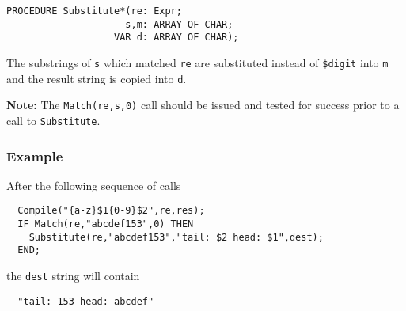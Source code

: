 {\samepage
{}
\begin{verbatim}
PROCEDURE Substitute*(re: Expr;
                     s,m: ARRAY OF CHAR;
                   VAR d: ARRAY OF CHAR);
\end{verbatim}
}
\ModuleList
The substrings of {\tt s} which matched {\tt re}
are substituted instead of \verb|$digit| into {\tt m} and
the result string is copied into {\tt d}.

{\bf Note:} The {\tt Match(re,s,0)} call should be issued
and tested for success prior to a call to {\tt Substitute}.

\subsubsection{Example}

After the following sequence of calls
\begin{verbatim}
  Compile("{a-z}$1{0-9}$2",re,res);
  IF Match(re,"abcdef153",0) THEN
    Substitute(re,"abcdef153","tail: $2 head: $1",dest);
  END;
\end{verbatim}

the {\tt dest} string will contain
\begin{verbatim}
  "tail: 153 head: abcdef"
\end{verbatim}


